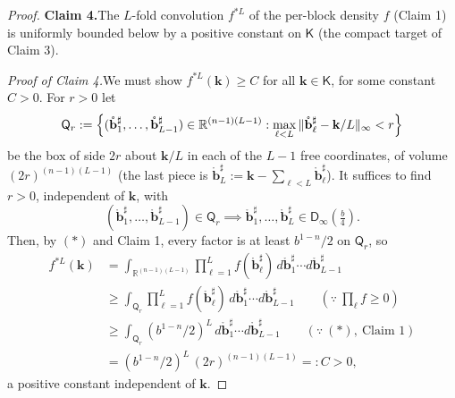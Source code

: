 \documentclass[11pt]{article}
\theoremstyle{definition}
\begin{document}
\begin{proof}
\smallskip\noindent\textbf{Claim 4.}\quad The $L$-fold convolution $f^{\ast L}$ of the per-block density $f$ (Claim 1) is uniformly bounded below by a positive constant on $\mathsf{K}$ (the compact target of Claim 3).

\smallskip
\noindent\emph{Proof of Claim 4.}\quad We must show $f^{\ast L}(\mathbf{k})\geq C$ for all $\mathbf{k}\in\mathsf{K}$, for some constant $C>0$. For $r>0$ let
\[
  \mathsf{Q}_r := \Bigl\{(\mathring{\mathbf{b}}^{\sharp}_1,\ldots,\mathring{\mathbf{b}}^{\sharp}_{L-1})\in\mathbb{R}^{(n-1)(L-1)} : \max_{\ell<L}\|\mathring{\mathbf{b}}^{\sharp}_\ell-\mathbf{k}/L\|_\infty < r\Bigr\}
\]
be the box of side $2r$ about $\mathbf{k}/L$ in each of the $L-1$ free coordinates, of volume $(2r)^{(n-1)(L-1)}$ (the last piece is $\mathring{\mathbf{b}}^{\sharp}_L:=\mathbf{k}-\sum_{\ell<L}\mathring{\mathbf{b}}^{\sharp}_\ell$). It suffices to find $r>0$, independent of $\mathbf{k}$, with
\[
  (\mathring{\mathbf{b}}^{\sharp}_1,\ldots,\mathring{\mathbf{b}}^{\sharp}_{L-1})\in\mathsf{Q}_r
  \implies \mathring{\mathbf{b}}^{\sharp}_1,\ldots,\mathring{\mathbf{b}}^{\sharp}_L\in\mathsf{D}_\infty(\tfrac{b}{4}). \tag*{$(\ast)$}
\]
Then, by $(\ast)$ and Claim 1, every factor is at least $b^{1-n}/2$ on $\mathsf{Q}_r$, so
\begin{align*}
  f^{\ast L}(\mathbf{k})
  &= \int_{\mathbb{R}^{(n-1)(L-1)}}\prod_{\ell=1}^{L} f(\mathring{\mathbf{b}}^{\sharp}_\ell)\,d\mathring{\mathbf{b}}^{\sharp}_1\cdots d\mathring{\mathbf{b}}^{\sharp}_{L-1} \\
  &\geq \int_{\mathsf{Q}_r}\prod_{\ell=1}^{L} f(\mathring{\mathbf{b}}^{\sharp}_\ell)\,d\mathring{\mathbf{b}}^{\sharp}_1\cdots d\mathring{\mathbf{b}}^{\sharp}_{L-1}
  \qquad(\because\ \textstyle\prod_\ell f\geq 0) \\
  &\geq \int_{\mathsf{Q}_r} (b^{1-n}/2)^L\,d\mathring{\mathbf{b}}^{\sharp}_1\cdots d\mathring{\mathbf{b}}^{\sharp}_{L-1}
  \qquad(\because\ (\ast),\ \text{Claim 1}) \\
  &= (b^{1-n}/2)^L\,(2r)^{(n-1)(L-1)} =: C > 0 ,
\end{align*}
a positive constant independent of $\mathbf{k}$.


\end{proof}
\end{document}
